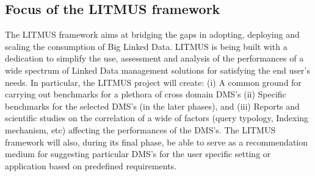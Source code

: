 \documentclass{llncs}
\begin{document}
    \subsection{Focus of the LITMUS framework}
    The LITMUS framework aims at bridging the gaps in adopting, deploying and scaling the consumption of Big Linked Data. LITMUS is being built with a dedication to simplify the use, assessment and analysis of the performances of a wide spectrum of Linked Data management solutions for satisfying the end user's needs.  In particular, the LITMUS project will create: (i) A common ground for carrying out benchmarks for a plethora of cross domain DMS's (ii) Specific benchmarks for the selected DMS's (in the later phases), and  (iii) Reports and scientific studies on the correlation of a wide of factors (query typology, Indexing mechanism, etc) affecting the performances of the DMS's. The LITMUS framework will also, during its final phase, be able to serve as a recommendation medium for suggesting particular DMS's for the user specific setting or application based on predefined requirements. 
    
\end{document}
